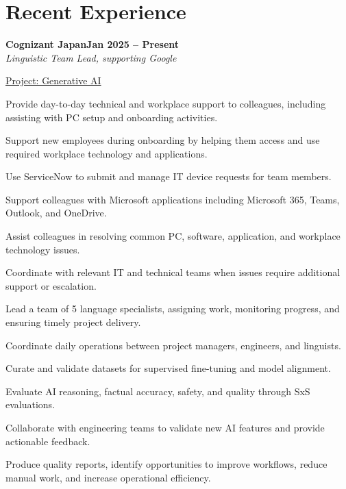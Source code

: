 \documentclass[letterpaper,10pt]{article}
\newcommand{\heading}[2]{
  \hspace{10pt}#1\hfill#2\\
}
\newcommand{\headingBf}[2]{
  \heading{\textbf{#1}}{\textbf{#2}}
}
\newcommand{\headingIt}[2]{
  \heading{\textit{#1}}{\textit{#2}}
}
\newenvironment{resume_list}{
  \vspace{-7pt}
  \begin{itemize}[itemsep=-2px, parsep=1pt, leftmargin=30pt]
}{
  \end{itemize}
}
\newcommand{\itemTitle}[1]{
  \item[] \underline{#1}\vspace{4pt}
}
\begin{document}

  \section{Recent Experience}

  \headingBf{Cognizant Japan}{Jan 2025 -- Present}
  \headingIt{Linguistic Team Lead, supporting Google}{}
  \begin{resume_list}
  
  \itemTitle{Project: Generative AI}
    \item {Provide day-to-day technical and workplace support to colleagues, including assisting with PC setup and onboarding activities.}
    \item {Support new employees during onboarding by helping them access and use required workplace technology and applications.}
    \item {Use ServiceNow to submit and manage IT device requests for team members.}
    \item {Support colleagues with Microsoft applications including Microsoft 365, Teams, Outlook, and OneDrive.}
    \item {Assist colleagues in resolving common PC, software, application, and workplace technology issues.}
    \item {Coordinate with relevant IT and technical teams when issues require additional support or escalation.}
    \item {Lead a team of 5 language specialists, assigning work, monitoring progress, and ensuring timely project delivery.}
    \item {Coordinate daily operations between project managers, engineers, and linguists.}
    \item {Curate and validate datasets for supervised fine-tuning and model alignment.}
    \item {Evaluate AI reasoning, factual accuracy, safety, and quality through SxS evaluations.}
    \item {Collaborate with engineering teams to validate new AI features and provide actionable feedback.}
    \item {Produce quality reports, identify opportunities to improve workflows, reduce manual work, and increase operational efficiency.}
    
  \end{resume_list}
  
\end{document}
